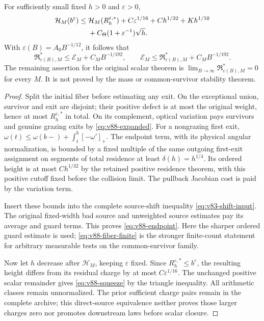\begin{theorem}
\label{thm:v88-endpoint}
For sufficiently small fixed $h>0$ and $\varepsilon>0$,
\begin{align}
 \mathcal H_M(b^\varepsilon)\le{}&
 \mathcal H_M(R_h^{\varepsilon,*})+C\varepsilon^{1/16}
       +Ch^{1/32}+Kh^{1/10}\notag\\
       &+C_\Theta(1+\varepsilon^{-1})\sqrt h.
                                              \label{eq:v88-endpoint}
\end{align}
With $\varepsilon(B)=A_0B^{-1/12}$, it follows that
\begin{equation}\label{eq:v88-squeeze}
 \mathfrak R_{\varepsilon(B),M}^*\le\mathcal E_M+C_MB^{-1/192},
 \qquad
 \mathcal E_M\le\mathfrak R_{\varepsilon(B),M}^*+C_MB^{-1/192}.
\end{equation}
The remaining assertion for the original scalar theorem is
$\lim_{B\to\infty}\mathfrak R_{\varepsilon(B),M}^*=0$ for every $M$.
It is not proved by the mass or common-survivor stability theorem.
\end{theorem}
\begin{proof}
Split the initial fiber before estimating any exit. On the exceptional
union, survivor and exit are disjoint; their positive defect is at most
the original weight, hence at most $R_h^{\varepsilon,*}$ in total.
On its complement, optical variation pays survivors and genuine grazing
exits by \eqref{eq:v88-expanded}. For a nongrazing first exit,
$\omega(t)\le\omega(b-)+\int_t^b[-\omega']_+$.
The endpoint term, with its physical angular normalization, is bounded
by a fixed multiple of the same outgoing first-exit assignment on
segments of total residence at least $\delta(h)=h^{1/4}$.
Its ordered height is at most $Ch^{1/32}$ by the retained positive
residence theorem, with this positive cutoff fixed before the collision
limit. The pullback Jacobian cost is paid by the variation term.

Insert these bounds into the complete source-shift inequality
\eqref{eq:v83-shift-input}. The original fixed-width bad source and
unweighted source estimates pay its average and guard terms. This proves
\eqref{eq:v88-endpoint}. Here the sharper ordered guard estimate is
used; \eqref{eq:v88-fiber-finite} is the stronger finite-count statement
for arbitrary measurable tests on the common-survivor family.

Now let $h$ decrease after $\mathcal H_M$, keeping $\varepsilon$
fixed. Since $R_h^{\varepsilon,*}\le b^\varepsilon$, the resulting
height differs from its residual charge by at most
$C\varepsilon^{1/16}$. The unchanged positive scalar remainder gives
\eqref{eq:v88-squeeze} by the triangle inequality. All arithmetic
classes remain unnormalized. The prior sufficient charge pairs remain
in the complete archive; this direct-source equivalence neither proves
those larger charges zero nor promotes downstream laws before scalar
closure.
\end{proof}
